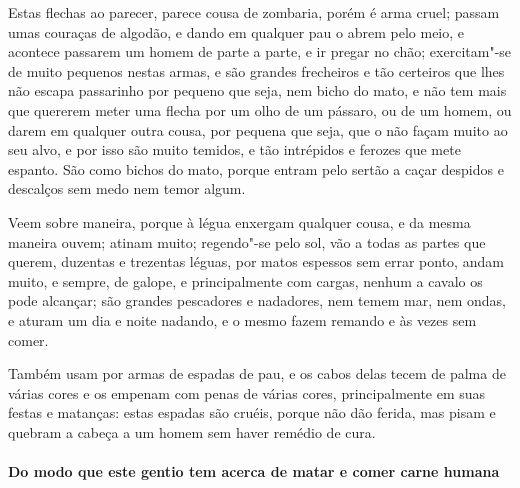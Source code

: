  Estas flechas ao parecer, parece cousa de zombaria, porém é arma cruel;
passam umas couraças de algodão, e dando em qualquer pau o abrem pelo
meio, e acontece passarem um homem de parte a parte, e ir pregar no
chão; exercitam"-se de muito pequenos nestas armas, e são grandes
frecheiros e tão certeiros que lhes não escapa passarinho por pequeno
que seja, nem bicho do mato, e não tem mais que quererem meter uma
flecha por um olho de um pássaro, ou de um homem, ou darem em qualquer
outra cousa, por pequena que seja, que o não façam muito ao seu alvo, e
por isso são muito temidos, e tão intrépidos e ferozes que mete
espanto. São como bichos do mato, porque entram pelo sertão a caçar
despidos e descalços sem medo nem temor algum.

 Veem sobre maneira, porque à légua enxergam qualquer cousa, e da mesma
maneira ouvem; atinam muito; regendo"-se pelo sol, vão a todas as partes
que querem, duzentas e trezentas léguas, por matos espessos sem errar
ponto, andam muito, e sempre, de galope, e principalmente com cargas,
nenhum a cavalo os pode alcançar; são grandes pescadores e nadadores,
nem temem mar, nem ondas, e aturam um dia e noite nadando, e o mesmo
fazem remando e às vezes sem comer.

 Também usam por armas de espadas de pau, e os cabos delas tecem de
palma de várias cores e os empenam com penas de várias cores,
principalmente em suas festas e matanças: estas espadas são cruéis,
porque não dão ferida, mas pisam e quebram a cabeça a um homem sem
haver remédio de cura.

\paragraph{Do modo que este gentio tem acerca de matar e comer carne humana}

